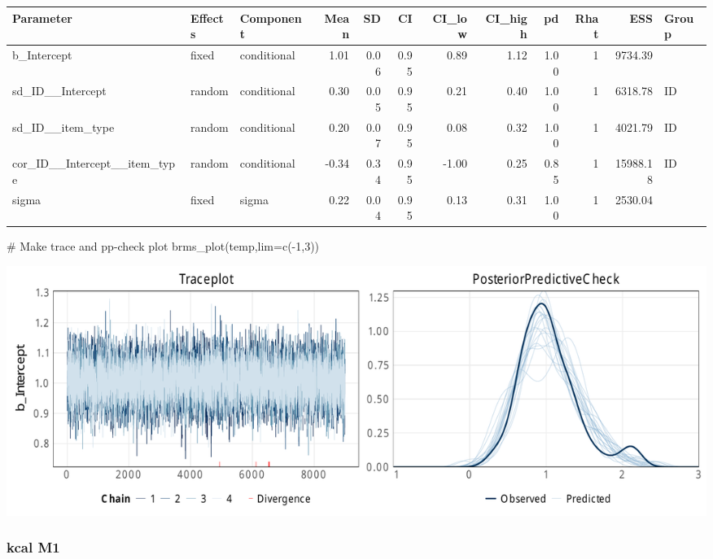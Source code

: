 \documentclass[
  letterpaper,
  DIV=11,
  numbers=noendperiod]{scrartcl}
\newenvironment{Shaded}{\begin{snugshade}}{\end{snugshade}}
\newcommand{\AttributeTok}[1]{\textcolor[rgb]{0.40,0.45,0.13}{#1}}
\newcommand{\CommentTok}[1]{\textcolor[rgb]{0.37,0.37,0.37}{#1}}
\newcommand{\DecValTok}[1]{\textcolor[rgb]{0.68,0.00,0.00}{#1}}
\newcommand{\FunctionTok}[1]{\textcolor[rgb]{0.28,0.35,0.67}{#1}}
\newcommand{\NormalTok}[1]{\textcolor[rgb]{0.00,0.23,0.31}{#1}}
\newcommand{\OtherTok}[1]{\textcolor[rgb]{0.00,0.23,0.31}{#1}}
\newcommand{\SpecialCharTok}[1]{\textcolor[rgb]{0.37,0.37,0.37}{#1}}
\newcommand{\StringTok}[1]{\textcolor[rgb]{0.13,0.47,0.30}{#1}}
\begin{document}
\begin{longtable*}[t]{lllrrrrrrrrl}
\toprule
Parameter & Effects & Component & Mean & SD & CI & CI\_low & CI\_high & pd & Rhat & ESS & Group\\
\midrule
b\_Intercept & fixed & conditional & 1.01 & 0.06 & 0.95 & 0.89 & 1.12 & 1.00 & 1 & 9734.39 & \\
sd\_ID\_\_Intercept & random & conditional & 0.30 & 0.05 & 0.95 & 0.21 & 0.40 & 1.00 & 1 & 6318.78 & ID\\
sd\_ID\_\_item\_type & random & conditional & 0.20 & 0.07 & 0.95 & 0.08 & 0.32 & 1.00 & 1 & 4021.79 & ID\\
cor\_ID\_\_Intercept\_\_item\_type & random & conditional & -0.34 & 0.34 & 0.95 & -1.00 & 0.25 & 0.85 & 1 & 15988.18 & ID\\
sigma & fixed & sigma & 0.22 & 0.04 & 0.95 & 0.13 & 0.31 & 1.00 & 1 & 2530.04 & \\
\bottomrule
\end{longtable*}

\begin{Shaded}
\begin{Highlighting}[]
\CommentTok{\# Make trace and pp{-}check plot}
\FunctionTok{brms\_plot}\NormalTok{(temp,}\AttributeTok{lim=}\FunctionTok{c}\NormalTok{(}\SpecialCharTok{{-}}\DecValTok{1}\NormalTok{,}\DecValTok{3}\NormalTok{))}
\end{Highlighting}
\end{Shaded}

\includegraphics{supplement_files/figure-pdf/h2bM0kcal-1.pdf}

\subsubsection{kcal M1}\label{kcal-m1-3}

\begin{Shaded}
\end{Shaded}
\end{document}
